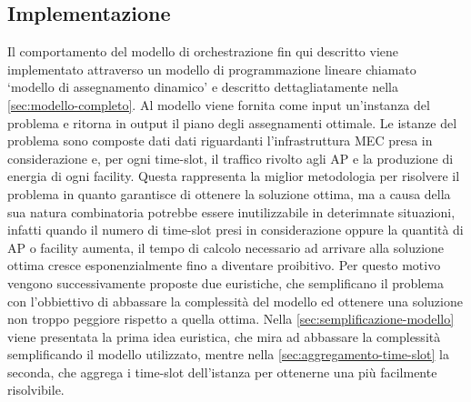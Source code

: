 %
%
\subsection{Implementazione}
\label{sub-sec:implementazione}

Il comportamento del modello di orchestrazione fin qui descritto viene implementato attraverso un modello di programmazione lineare chiamato `modello di assegnamento dinamico' e descritto dettagliatamente nella \autoref{sec:modello-completo}. Al modello viene fornita come input un'instanza del problema e ritorna in output il piano degli assegnamenti ottimale. Le istanze del problema sono composte dati dati riguardanti l'infrastruttura MEC presa in considerazione e, per ogni time-slot, il traffico rivolto agli AP e la produzione di energia di ogni facility. Questa rappresenta la miglior metodologia per risolvere il problema in quanto garantisce di ottenere la soluzione ottima, ma a causa della sua natura combinatoria potrebbe essere inutilizzabile in deterimnate situazioni, infatti quando il numero di time-slot presi in considerazione oppure la quantità di AP o facility aumenta, il tempo di calcolo necessario ad arrivare alla soluzione ottima cresce esponenzialmente fino a diventare proibitivo. Per questo motivo vengono successivamente proposte due euristiche, che semplificano il problema con l'obbiettivo di abbassare la complessità del modello ed ottenere una soluzione non troppo peggiore rispetto a quella ottima. Nella \autoref{sec:semplificazione-modello} viene presentata la prima idea euristica, che mira ad abbassare la complessità semplificando il modello utilizzato, mentre nella \autoref{sec:aggregamento-time-slot} la seconda, che aggrega i time-slot dell'istanza per ottenerne una più facilmente risolvibile.

